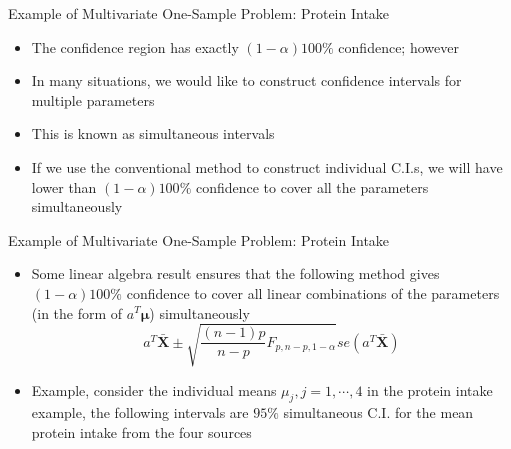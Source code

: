 \documentclass[
  ignorenonframetext,
]{beamer}
\providecommand{\tightlist}{%
  \setlength{\itemsep}{0pt}\setlength{\parskip}{0pt}}
\begin{document}
\begin{frame}{Example of Multivariate One-Sample Problem: Protein
Intake}
\protect\hypertarget{example-of-multivariate-one-sample-problem-protein-intake-4}{}
\begin{itemize}
\tightlist
\item
  The confidence region has exactly \((1-\alpha)100\%\) confidence;
  however
\item
  In many situations, we would like to construct confidence intervals
  for multiple parameters
\item
  This is known as simultaneous intervals
\item
  If we use the conventional method to construct individual C.I.s, we
  will have lower than \((1-\alpha)100\%\) confidence to cover all the
  parameters simultaneously
\end{itemize}
\end{frame}

\begin{frame}{Example of Multivariate One-Sample Problem: Protein
Intake}
\protect\hypertarget{example-of-multivariate-one-sample-problem-protein-intake-5}{}
\begin{itemize}
\tightlist
\item
  Some linear algebra result ensures that the following method gives
  \((1-\alpha)100\%\) confidence to cover all linear combinations of the
  parameters (in the form of \(a^T\boldsymbol \mu\)) simultaneously
  \[a^T\bar{\mathbf X}\pm \sqrt{\frac{(n-1)p}{n-p}F_{p, n-p, 1-\alpha}} se(a^T\bar{\mathbf X}) \]
\item
  Example, consider the individual means \(\mu_j, j=1,\cdots, 4\) in the
  protein intake example, the following intervals are \(95\%\)
  simultaneous C.I. for the mean protein intake from the four sources
\end{itemize}
\end{frame}
\end{document}
